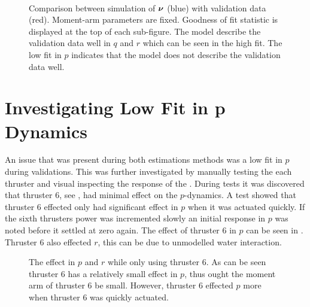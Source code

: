 \begin{figure}[tbp]
  \centering
  \qquad
  \\
  \caption{\label{fig:ResultKalmanFixedMomentArms}%
    Comparison between simulation of $\boldsymbol{\nu}$ (blue) with validation data (red). Moment-arm parameters are fixed. Goodness of fit statistic is displayed at the top of each sub-figure. The model describe the validation data well in $q$ and $r$ which can be seen in the high fit. The low fit in $p$ indicates that the model does not describe the validation data well.}
\end{figure}


\section{Investigating Low Fit in p Dynamics}
An issue that was present during both estimations methods was a low fit in $p$ during validations. This was further investigated by manually testing the each thruster and visual inspecting the response of the \abbrROV. During tests it was discovered that thruster 6, see , had minimal effect on the $p$-dynamics. A test showed that thruster 6 effected only had significant effect in $p$ when it was actuated quickly. If the sixth thrusters power was incremented slowly an initial response in $p$ was noted before it settled at zero again. The effect of thruster 6 in $p$ can be seen in . Thruster 6 also effected $r$, this can be due to unmodelled water interaction.

\begin{figure}
\centering
  \qquad
  \qquad
  \caption{\label{fig:thruster6}%
  The effect in $p$ and $r$ while only using thruster 6. As can be seen thruster 6 has a relatively small effect in $p$, thus ought the moment arm of thruster 6 be small. However, thruster 6 effected $p$ more when thruster 6 was quickly actuated.}
\end{figure}

